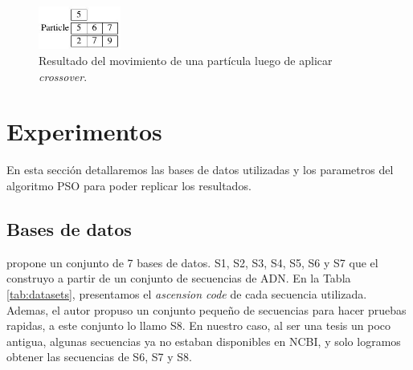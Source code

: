 \documentclass{cup-pan}
\begin{document}
	
	
	\begin{figure}[h]
		\centering
		\includegraphics[width=0.24\textwidth]{images/pso_3}
		\caption{Resultado del movimiento de una partícula luego de aplicar \textit{crossover}.}
		\label{fig:pso_3}
	\end{figure}


	\section{Experimentos}
	
	En esta sección detallaremos las bases de datos utilizadas y los parametros del algoritmo PSO para poder replicar los resultados.
	
	\subsection{Bases de datos}
	\citet{zablocki2009multiple} propone un conjunto de 7 bases de datos. S1, S2, S3, S4, S5, S6 y S7 que el construyo a partir de un conjunto de secuencias de ADN. En la Tabla \ref{tab:datasets}, presentamos el \textit{ascension code} de cada secuencia utilizada. Ademas, el autor propuso un conjunto pequeño de secuencias para hacer pruebas rapidas, a este conjunto lo llamo S8. En nuestro caso, al ser una tesis un poco antigua, algunas secuencias ya no estaban disponibles en NCBI, y solo logramos obtener las secuencias de S6, S7 y S8.
	
\end{document}
